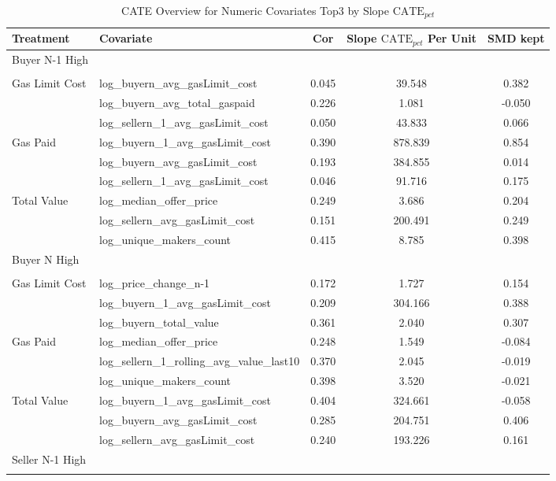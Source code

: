 \begin{table}
\caption{CATE Overview for Numeric Covariates Top3 by Slope $\text{CATE}_{pct}$}
\label{tab:m2\_cate\_n}
\begin{tabular}{llccc}
\toprule
Treatment & Covariate  & Cor  & Slope $\text{CATE}_{pct}$ Per Unit& SMD kept\\
\midrule
Buyer N-1 High &  &  &  & \\
\\
Gas Limit Cost & log\_buyern\_avg\_gasLimit\_cost & 0.045 & 39.548 & 0.382\\
 & log\_buyern\_avg\_total\_gaspaid & 0.226 & 1.081 & -0.050\\
 & log\_sellern\_1\_avg\_gasLimit\_cost & 0.050 & 43.833 & 0.066\\
Gas Paid & log\_buyern\_1\_avg\_gasLimit\_cost & 0.390 & 878.839 & 0.854\\
 & log\_buyern\_avg\_gasLimit\_cost & 0.193 & 384.855 & 0.014\\
 & log\_sellern\_1\_avg\_gasLimit\_cost & 0.046 & 91.716 & 0.175\\
Total Value & log\_median\_offer\_price & 0.249 & 3.686 & 0.204\\
 & log\_sellern\_avg\_gasLimit\_cost & 0.151 & 200.491 & 0.249\\
 & log\_unique\_makers\_count & 0.415 & 8.785 & 0.398\\
Buyer N High &  &  &  & \\
\\
Gas Limit Cost & log\_price\_change\_n-1 & 0.172 & 1.727 & 0.154\\
 & log\_buyern\_1\_avg\_gasLimit\_cost & 0.209 & 304.166 & 0.388\\
 & log\_buyern\_total\_value & 0.361 & 2.040 & 0.307\\
Gas Paid & log\_median\_offer\_price & 0.248 & 1.549 & -0.084\\
 & log\_sellern\_1\_rolling\_avg\_value\_last10 & 0.370 & 2.045 & -0.019\\
 & log\_unique\_makers\_count & 0.398 & 3.520 & -0.021\\
Total Value & log\_buyern\_1\_avg\_gasLimit\_cost & 0.404 & 324.661 & -0.058\\
 & log\_buyern\_avg\_gasLimit\_cost & 0.285 & 204.751 & 0.406\\
 & log\_sellern\_avg\_gasLimit\_cost & 0.240 & 193.226 & 0.161\\
Seller N-1 High &  &  &  & \\
\\

\end{tabular}
\end{table}
